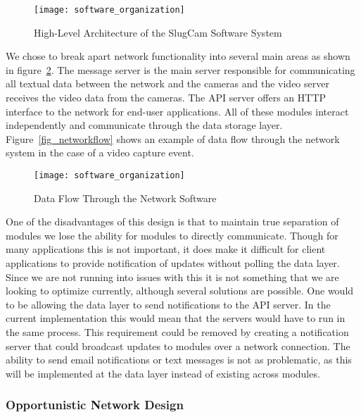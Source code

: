 \begin{figure}[!t]
\centering
\texttt{[image: software\_organization]}
\caption{High-Level Architecture of the SlugCam Software System}
\label{fig_netoverview}
\end{figure}

We chose to break apart network functionality into several main areas as shown
in figure~\ref{fig_netoverview}. The message server is the main server
responsible for communicating all textual data between the network and the
cameras and the video server receives the video data from the cameras. The API
server offers an HTTP interface to the network for end-user applications. All of
these modules interact independently and communicate through the data storage
layer. Figure~\ref{fig_networkflow} shows an example of data flow through the
network system in the case of a video capture event.

\begin{figure}[!t]
\centering
\texttt{[image: software\_organization]}
\caption{Data Flow Through the Network Software}
\label{fig_netoverview}
\end{figure}

One of the disadvantages of this design is that to maintain true separation of
modules we lose the ability for modules to directly communicate.  Though for
many applications this is not important, it does make it difficult for client
applications to provide notification of updates without polling the data layer.
Since we are not running into issues with this it is not something that we are
looking to optimize currently, although several solutions are possible. One
would to be allowing the data layer to send notifications to the API server.  In
the current implementation this would mean that the servers would have to run in
the same process. This requirement could be removed by creating a notification
server that could broadcast updates to modules over a network connection. The
ability to send email notifications or text messages is not as problematic, as
this will be implemented at the data layer instead of existing across modules.


\subsubsection{Opportunistic Network Design}

